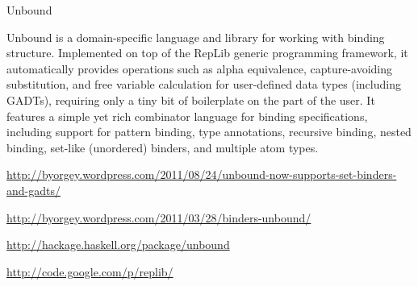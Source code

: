 \begin{hcarentry}{Unbound}
\makeheader

Unbound is a domain-specific language and library for working with
binding structure.  Implemented on top of the RepLib generic
programming framework, it automatically provides operations such as
alpha equivalence, capture-avoiding substitution, and free variable
calculation for user-defined data types (including GADTs), requiring
only a tiny bit of boilerplate on the part of the user.  It features a
simple yet rich combinator language for binding specifications,
including support for pattern binding, type annotations, recursive
binding, nested binding, set-like (unordered) binders, and multiple
atom types.

\FurtherReading
\begin{compactitem}
\item \url{http://byorgey.wordpress.com/2011/08/24/unbound-now-supports-set-binders-and-gadts/}
\item \url{http://byorgey.wordpress.com/2011/03/28/binders-unbound/}
\item \url{http://hackage.haskell.org/package/unbound}
\item \url{http://code.google.com/p/replib/}
\end{compactitem}
\end{hcarentry}
